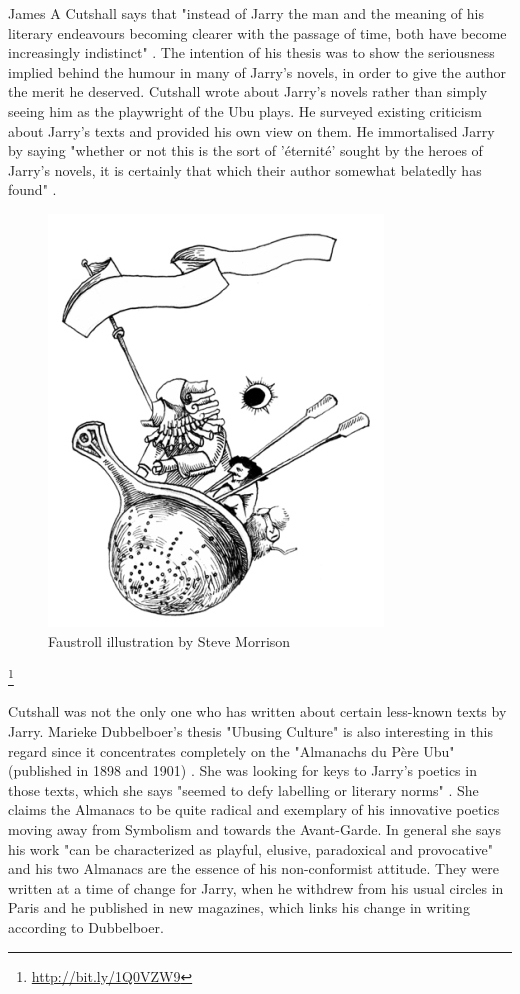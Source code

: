 James A Cutshall says that "instead of Jarry the man and the meaning of his literary endeavours becoming clearer with the passage of time, both have become increasingly indistinct" \citep[p.246]{Cutshall1988}. The intention of his thesis was to show the seriousness implied behind the humour in many of Jarry's novels, in order to give the author the merit he deserved. Cutshall wrote about Jarry's novels rather than simply seeing him as the playwright of the Ubu plays. He surveyed existing criticism about Jarry's texts and provided his own view on them. He immortalised Jarry by saying "whether or not this is the sort of 'éternité' sought by the heroes of Jarry's novels, it is certainly that which their author somewhat belatedly has found" \citep[p.248]{Cutshall1988}.

\begin{figure}[htb]
  \centering
  \includegraphics[height=0.3\textheight]{images/faustroll}
  \caption[Faustroll]{Faustroll illustration by Steve Morrison}
  \label{fig:FAUSTROLL}
\end{figure}\footnote{\url{http://bit.ly/1Q0VZW9}} %

Cutshall was not the only one who has written about certain less-known texts by Jarry. Marieke Dubbelboer's thesis "Ubusing Culture" is also interesting in this regard since it concentrates completely on the "Almanachs du Père Ubu" (published in 1898 and 1901) \citep{Dubbelboer2009}. She was looking for keys to Jarry's poetics in those texts, which she says "seemed to defy labelling or literary norms" \citep[p.10]{Dubbelboer2009}. She claims the Almanacs to be quite radical and exemplary of his innovative poetics moving away from Symbolism and towards the Avant-Garde. In general she says his work "can be characterized as playful, elusive, paradoxical and provocative" \citep[p.197]{Dubbelboer2009} and his two Almanacs are the essence of his non-conformist attitude. They were written at a time of change for Jarry, when he withdrew from his usual circles in Paris and he published in new magazines, which links his change in writing according to Dubbelboer.

